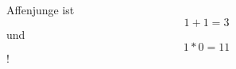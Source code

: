 \documentclass[a4paper,12pt]{article}
\begin{document}
Affenjunge ist
\begin{equation}
	1+1=3
\end{equation}
und 
\begin{equation}
	1*0=11
\end{equation}
!
\end{document}
